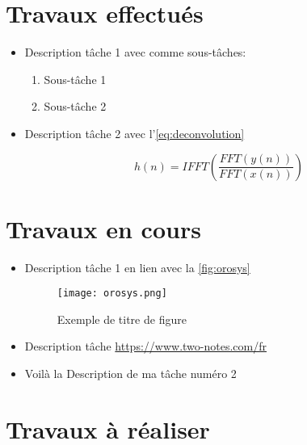 \documentclass[12pt, a4paper]{article}
\begin{document}
\section{Travaux effectués}

\begin{itemize}
\item Description tâche 1 avec comme sous-tâches:
	\begin{enumerate}
	\item Sous-tâche 1
	\item Sous-tâche 2	
	\end{enumerate}
\item Description tâche 2 avec l'\autoref{eq:deconvolution}

\begin{equation}
    \label{eq:deconvolution}
    h(n) = IFFT \left( \frac{FFT(y(n))}{FFT(x(n))} \right)
\end{equation}

\end{itemize}

\section{Travaux en cours}

\begin{itemize}
\item Description tâche 1 en lien avec la \autoref{fig:orosys}

\begin{figure}[h!]
\centering
\texttt{[image: orosys.png]}
\caption{Exemple de titre de figure}
\label{fig:orosys}
\end{figure}

\item Description tâche \url{https://www.two-notes.com/fr}
\item Voilà la Description de ma tâche numéro 2

\end{itemize}

\section{Travaux à réaliser}
\end{document}
